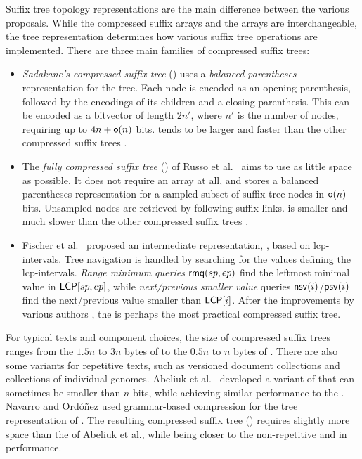Suffix tree topology representations are the main difference between the
various \CST{} proposals. While the compressed suffix arrays and the \LCP{} arrays
are interchangeable, the tree representation determines how various suffix tree
operations are implemented. There are three main families of compressed suffix
trees:
\begin{itemize}
\item \emph{Sadakane's compressed suffix tree} (\CSTsada) \cite{Sadakane2007}
uses a \emph{balanced parentheses} representation for the tree. Each node is
encoded as an opening parenthesis, followed by the encodings of its children
and a closing parenthesis. This can be encoded as a bitvector of length $2n'$,
where $n'$ is the number of nodes, requiring up to $4n+\mathsf{o}(n)$ bits.
\CSTsada{} tends to be larger and faster than the other compressed suffix
trees \cite{Gog2011a,Abeliuk2013}.
\item The \emph{fully compressed suffix tree} (\FCST) of Russo et
al.~\cite{Russo2011,Navarro2014a} aims to use as little space as possible. It
does not require an \LCP{} array at all, and stores a balanced parentheses
representation for a sampled subset of suffix tree nodes in $\mathsf{o}(n)$ bits.
Unsampled nodes are retrieved by following suffix links. \FCST{} is smaller
and much slower than the other compressed suffix trees
\cite{Russo2011,Abeliuk2013}.
\item Fischer et al.~\cite{Fischer2009a} proposed an intermediate
representation, \CSTnpr, based on lcp-intervals. Tree navigation is handled
by searching for the values defining the lcp-intervals. \emph{Range minimum
queries} $\mathsf{rmq}(sp,ep)$ find the leftmost minimal value in $\mathsf{LCP}[sp,ep]$,
while \emph{next/previous smaller value} queries $\mathsf{nsv}(i)$/$\mathsf{psv}(i)$ find
the next/previous \LCP{} value smaller than $\mathsf{LCP}[i]$. After the improvements
by various authors \cite{Ohlebusch2009,Fis10,Ohlebusch2010,Gog2011a,Abeliuk2013},
the \CSTnpr{} is perhaps the most practical compressed suffix tree.
\end{itemize}

For typical texts and component choices, the size of compressed suffix trees
ranges from the $1.5n$ to $3n$ bytes of \CSTsada{} to the $0.5n$ to $n$ bytes
of \FCST{} \cite{Gog2011a,Abeliuk2013}. There are also some \CST{} variants
for repetitive texts, such as versioned document collections and collections
of individual genomes. Abeliuk et al.~\cite{Abeliuk2013} developed a variant
of \CSTnpr{} that can sometimes be smaller than $n$ bits, while achieving
similar performance to the \FCST. Navarro and Ordóñez \cite{Navarro2015} used
grammar-based compression for the tree representation of \CSTsada. The
resulting compressed suffix tree (\GCT) requires slightly more space than the
\CSTnpr{} of Abeliuk et al., while being closer to the non-repetitive
\CSTsada{} and \CSTnpr{} in performance.

